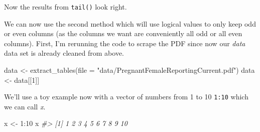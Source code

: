 \documentclass[
]{krantz}
\makeatletter
\newenvironment{Shaded}{\begin{snugshade}}{\end{snugshade}}
\newcommand{\AttributeTok}[1]{\textcolor[rgb]{0.61,0.61,0.61}{#1}}
\newcommand{\CommentTok}[1]{\textcolor[rgb]{0.37,0.37,0.37}{\textit{#1}}}
\newcommand{\DecValTok}[1]{\textcolor[rgb]{0.06,0.06,0.06}{#1}}
\newcommand{\FunctionTok}[1]{\textcolor[rgb]{0,0,0}{#1}}
\newcommand{\NormalTok}[1]{#1}
\newcommand{\OtherTok}[1]{\textcolor[rgb]{0.37,0.37,0.37}{#1}}
\newcommand{\SpecialCharTok}[1]{\textcolor[rgb]{0,0,0}{#1}}
\newcommand{\StringTok}[1]{\textcolor[rgb]{0.5,0.5,0.5}{#1}}
\newenvironment{kframe}{%
\medskip{}
\setlength{\fboxsep}{.8em}
 \def\at@end@of@kframe{}%
 \ifinner\ifhmode%
  \def\at@end@of@kframe{\end{minipage}}%
  \begin{minipage}{\columnwidth}%
 \fi\fi%
 \def\FrameCommand##1{\hskip\@totalleftmargin \hskip-\fboxsep
 \colorbox{shadecolor}{##1}\hskip-\fboxsep
     \hskip-\linewidth \hskip-\@totalleftmargin \hskip\columnwidth}%
 \MakeFramed {\advance\hsize-\width
   \@totalleftmargin\z@ \linewidth\hsize
   \@setminipage}}%
 {\par\unskip\endMakeFramed%
 \at@end@of@kframe}
\renewenvironment{Shaded}{\begin{kframe}}{\end{kframe}}
\makeatother
\begin{document}
\begin{Shaded}
\end{Shaded}

Now the results from \texttt{tail()} look right.

We can now use the second method which will use logical
values to only keep odd or even columns (as the columns we
want are conveniently all odd or all even columns). First,
I'm rerunning the code to scrape the PDF since now our
\emph{data} data set is already cleaned from above.

\begin{Shaded}
\begin{Highlighting}[]
\NormalTok{data }\OtherTok{\textless{}{-}} \FunctionTok{extract\_tables}\NormalTok{(}\AttributeTok{file =} \StringTok{"data/PregnantFemaleReportingCurrent.pdf"}\NormalTok{)}
\NormalTok{data }\OtherTok{\textless{}{-}}\NormalTok{ data[[}\DecValTok{1}\NormalTok{]]}
\end{Highlighting}
\end{Shaded}

We'll use a toy example now with a vector of numbers from 1
to 10 \texttt{1:10} which we can call \emph{x}.

\begin{Shaded}
\begin{Highlighting}[]
\NormalTok{x }\OtherTok{\textless{}{-}} \DecValTok{1}\SpecialCharTok{:}\DecValTok{10}
\NormalTok{x}
\CommentTok{\#\textgreater{}  [1]  1  2  3  4  5  6  7  8  9 10}
\end{Highlighting}
\end{Shaded}
\end{document}

